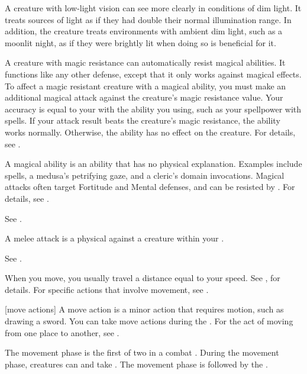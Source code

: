  A creature with low-light vision can see more clearly in conditions of dim light.
It treats sources of light as if they had double their normal illumination range.
In addition, the creature treats environments with ambient dim light, such as a moonlit night, as if they were brightly lit when doing so is beneficial for it.

 A creature with magic resistance can automatically resist magical abilities.
It functions like any other defense, except that it only works against magical effects.
To affect a magic resistant creature with a magical ability, you must make an additional magical attack against the creature's magic resistance value.
Your accuracy is equal to your  with the ability you using, such as your spellpower with spells.
If your attack result beats the creature's magic resistance, the ability works normally.
Otherwise, the ability has no effect on the creature.
For details, see .

 A magical ability is an ability that has no physical explanation.
Examples include spells, a medusa's petrifying gaze, and a cleric's domain invocations.
Magical attacks often target Fortitude and Mental defenses, and can be resisted by .
For details, see .

 See .

 A melee attack is a physical  against a creature within your .

 See .

 When you move, you usually travel a distance equal to your speed.
See , for details.
For specific actions that involve movement, see .

[move actions] A move action is a minor action that requires motion, such as drawing a sword.
You can take move actions during the .
For the act of moving from one place to another, see .

 The movement phase is the first of two  in a combat .
During the movement phase, creatures can  and take .
The movement phase is followed by the .

